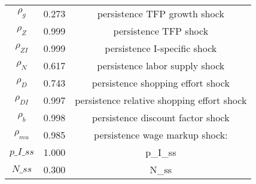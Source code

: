 \begin{center}
\begin{longtable}{ccc}
${\rho_g}$ 	 & 	 0.273 	 & 	 persistence TFP growth shock\\
${\rho_Z}$ 	 & 	 0.999 	 & 	 persistence TFP shock\\
${\rho_{ZI}}$ 	 & 	 0.999 	 & 	 persistence I-specific shock\\
${\rho_N}$ 	 & 	 0.617 	 & 	 persistence labor supply shock\\
${\rho_D}$ 	 & 	 0.743 	 & 	 persistence shopping effort shock\\
${\rho_{DI}}$ 	 & 	 0.997 	 & 	 persistence relative shopping effort shock\\
${\rho_b}$ 	 & 	 0.998 	 & 	 persistence discount factor shock\\
${\rho_{mu}}$ 	 & 	 0.985 	 & 	 persistence wage markup shock:\\
$p\_I\_ss$ 	 & 	 1.000 	 & 	 p\_I\_ss\\
$N\_ss$ 	 & 	 0.300 	 & 	 N\_ss\\
\bottomrule%
\end{longtable}
\end{center}
